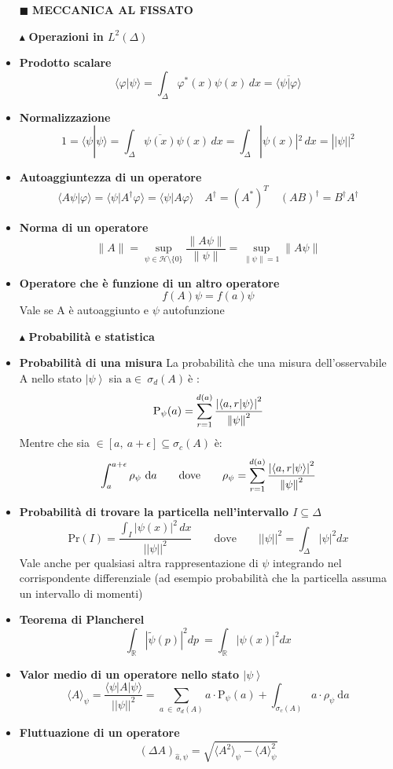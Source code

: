 \documentclass{book}
\newcommand{\g}{\textbf}
\newcommand{\e}{\begin{equation}}
\newcommand{\ex}{\end{equation} }
\renewcommand{\it}{\item[$\cdot$]}
\begin{document}
\begin{multicols}{4}

\begin{itemize}
\item [$\blacksquare$] \g{MECCANICA AL FISSATO}
\item [$\blacktriangle$] \g{Operazioni in $L^2(\Delta)$}
    \it \g{Prodotto scalare}
        \e{\langle \varphi | \psi \rangle = \int_{\Delta} \varphi^*(x) \psi(x) \, dx = \overline{\langle \psi | \varphi \rangle}} \ex
    \it \g{Normalizzazione }
        \e{1 = \langle \psi | \psi \rangle = \int_{\Delta} \overline{\psi(x)}\psi(x) \, dx = \int_{\Delta} |\psi(x)|^2 \, dx = ||\psi||^{2}}     \ex
    \it \g{Autoaggiuntezza di un operatore}
        \e{\langle A\psi | \varphi \rangle = \langle \psi | A^\dagger \varphi \rangle = \langle \psi | A \varphi \rangle \quad A^{\dagger} = (A^{*})^{T} \quad (AB)^{\dagger} = B^{\dagger}A^{\dagger}} \ex
        
    \it \g{Norma di un operatore}
        \e{\|A\| = \sup_{\psi \in \mathcal{H} \setminus \{0\}} \frac{\|A\psi\|}{\|\psi\|} = \sup_{\|\psi\|=1} \|A\psi\|} \ex
    \it \g{Operatore che è funzione di un altro operatore}
        \e{f(A)\psi = f(a)\psi}\ex
        Vale se A è autoaggiunto e $\psi$ autofunzione
    \item [$\blacktriangle$] \g{Probabilità e statistica}
    \it \g{Probabilità di una misura}
    La probabilità che una misura dell'osservabile A nello stato $\left|\psi\right>$ sia $\text{a} \in \ \sigma_{d}(A) \  \text{è}  $ :
            \e{ {\text{P}_{\psi}(a)} = \sum_{r=1}^{d(a)}\frac{\left| \braket{a,r}{\psi} \right|^{2}}{\norm{\psi}^{2}}} \ex
       Mentre che sia $\in [a, \ a + \epsilon] \subseteq \sigma_{c}(A)$ è:    
\e{\int_{a}^{a+\epsilon}\rho_{\psi}\ \text{d}a \qquad  \text{dove} \qquad \rho_{\psi} = \sum_{r=1}^{d(a)}\frac{\left| \braket{a,r}{\psi} \right|^{2}}{\norm{\psi}^{2}}}\ex

\it \g{Probabilità di trovare la particella nell'intervallo $I \subseteq \Delta$}
        \e{\mathrm{Pr}(I) = \frac{\int_I |\psi(x)|^2\, dx}{||\psi||^{2}} \qquad \text{dove} \qquad ||\psi||^{2} =\int_{\Delta}|\psi|^{2}dx } \ex
Vale anche per qualsiasi altra rappresentazione di $\psi$ integrando nel corrispondente differenziale (ad esempio probabilità che la particella assuma un intervallo di momenti)

    \it \g{Teorema di Plancherel}
\e{\int_{\mathbb{R}}|\tilde{\psi}(p)|^{2}dp \   = \int_{\mathbb{R}}|\psi(x)|^{2}dx }\ex

        \it \g{Valor medio di un operatore nello stato $\left|\psi\right>$}
            \e{\langle A \rangle_{\psi}   =  \frac{\langle \psi | A | \psi \rangle}{||\psi||^{2}} = \sum_{a \ \in \ \sigma_{d}(A)}a \cdot \text{P}_{\psi}(a) + \int_{\sigma_{c}(A)} a \cdot \rho_{\psi}\ \text{d}a} \ex
        \it \g{Fluttuazione di un operatore}
        \e{(\Delta A)_{\hat{a}, \psi} = \sqrt{ \langle A^2 \rangle_\psi - \langle A \rangle_\psi^2}} \ex
        

\end{itemize}
\end{multicols}
\end{document}
